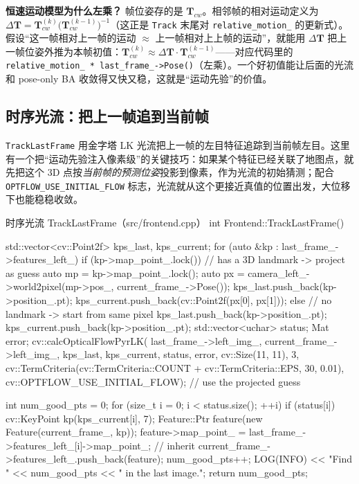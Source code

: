 \begin{insight}
\textbf{恒速运动模型为什么左乘？}
帧位姿存的是 $\mathbf{T}_{cw}$。相邻帧的相对运动定义为 $\Delta\mathbf{T}=\mathbf{T}_{cw}^{(k)}\big(\mathbf{T}_{cw}^{(k-1)}\big)^{-1}$（这正是 \texttt{Track} 末尾对 \texttt{relative\_motion\_} 的更新式）。假设“这一帧相对上一帧的运动 $\approx$ 上一帧相对上上帧的运动”，就能用 $\Delta\mathbf{T}$ 把上一帧位姿外推为本帧初值：$\mathbf{T}_{cw}^{(k)}\approx\Delta\mathbf{T}\cdot\mathbf{T}_{cw}^{(k-1)}$——对应代码里的 \verb|relative_motion_ * last_frame_->Pose()|（左乘）。一个好初值能让后面的光流和 pose-only BA 收敛得又快又稳，这就是“运动先验”的价值。
\end{insight}

\subsection{时序光流：把上一帧追到当前帧}
\label{sec:sys-trackflow}

\texttt{TrackLastFrame} 用金字塔 LK 光流把上一帧的左目特征追踪到当前帧左目。这里有一个把“运动先验注入像素级”的关键技巧：如果某个特征已经关联了地图点，就先把这个 3D 点按\emph{当前帧的预测位姿}投影到像素，作为光流的初始猜测；配合 \verb|OPTFLOW_USE_INITIAL_FLOW| 标志，光流就从这个更接近真值的位置出发，大位移下也能稳稳收敛。

\begin{codebox}[C++]{时序光流 TrackLastFrame（src/frontend.cpp）}
int Frontend::TrackLastFrame() {
    std::vector<cv::Point2f> kps_last, kps_current;
    for (auto &kp : last_frame_->features_left_) {
        if (kp->map_point_.lock()) {              // has a 3D landmark -> project as guess
            auto mp = kp->map_point_.lock();
            auto px = camera_left_->world2pixel(mp->pos_, current_frame_->Pose());
            kps_last.push_back(kp->position_.pt);
            kps_current.push_back(cv::Point2f(px[0], px[1]));
        } else {                                  // no landmark -> start from same pixel
            kps_last.push_back(kp->position_.pt);
            kps_current.push_back(kp->position_.pt);
        }
    }
    std::vector<uchar> status;
    Mat error;
    cv::calcOpticalFlowPyrLK(
        last_frame_->left_img_, current_frame_->left_img_, kps_last, kps_current,
        status, error, cv::Size(11, 11), 3,
        cv::TermCriteria(cv::TermCriteria::COUNT + cv::TermCriteria::EPS, 30, 0.01),
        cv::OPTFLOW_USE_INITIAL_FLOW);            // use the projected guess

    int num_good_pts = 0;
    for (size_t i = 0; i < status.size(); ++i) {
        if (status[i]) {
            cv::KeyPoint kp(kps_current[i], 7);
            Feature::Ptr feature(new Feature(current_frame_, kp));
            feature->map_point_ = last_frame_->features_left_[i]->map_point_; // inherit
            current_frame_->features_left_.push_back(feature);
            num_good_pts++;
        }
    }
    LOG(INFO) << "Find " << num_good_pts << " in the last image.";
    return num_good_pts;
}
\end{codebox}

